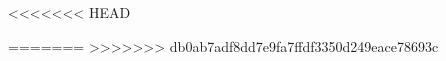 \documentclass[11pt, a4paper, spanish]{article}
\begin{document}
	\maketitle
<<<<<<< HEAD
	
	
=======
>>>>>>> db0ab7adf8dd7e9fa7ffdf3350d249eace78693c
\end{document}
